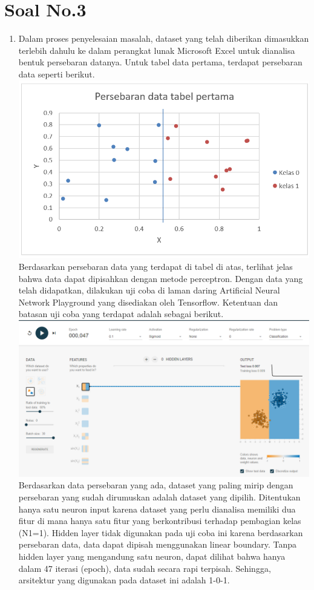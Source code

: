 \documentclass[12pt]{article}
\begin{document}
\section{Soal No.3}
\begin{enumerate}[label=(\alph*)]
	\item %
	Dalam proses penyelesaian masalah, dataset yang telah diberikan dimasukkan terlebih dahulu ke dalam perangkat lunak Microsoft Excel untuk dianalisa bentuk persebaran datanya. Untuk tabel data pertama, terdapat persebaran data seperti berikut.\\
	\includegraphics[scale=1]{UASFiskom0301.png}\\
	Berdasarkan persebaran data yang terdapat di tabel di atas, terlihat jelas bahwa data dapat dipisahkan dengan metode perceptron. Dengan data yang telah didapatkan, dilakukan uji coba di laman daring Artificial Neural Network Playground yang disediakan oleh Tensorflow. Ketentuan dan batasan uji coba yang terdapat adalah sebagai berikut. 
	\includegraphics[scale=0.4]{UASFiskom0302.png}\\
	Berdasarkan data persebaran yang ada, dataset yang paling mirip dengan persebaran yang sudah dirumuskan adalah dataset yang dipilih. Ditentukan hanya satu neuron input karena dataset yang perlu dianalisa memiliki dua fitur di mana hanya satu fitur yang berkontribusi terhadap pembagian kelas (N1=1). Hidden layer tidak digunakan pada uji coba ini karena berdasarkan persebaran data, data dapat dipisah menggunakan linear boundary. Tanpa hidden layer yang mengandung satu neuron, dapat dilihat bahwa hanya dalam 47 iterasi (epoch), data sudah secara rapi terpisah. Sehingga, arsitektur yang digunakan pada dataset ini adalah 1-0-1.

\end{enumerate}
\end{document}
